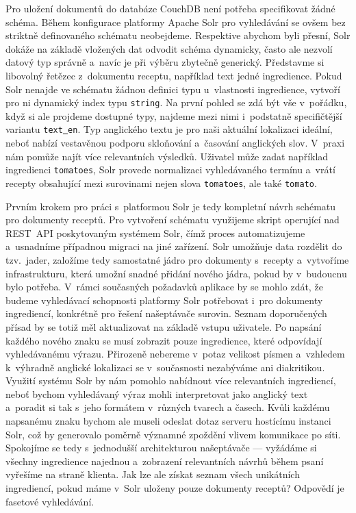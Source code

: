 Pro uložení dokumentů do databáze CouchDB není potřeba specifikovat žádné schéma. Během konfigurace platformy Apache Solr pro vyhledávání se ovšem bez striktně definovaného schématu neobejdeme. Respektive abychom byli přesní, Solr dokáže na základě vložených dat odvodit schéma dynamicky, často ale nezvolí datový typ správně a~navíc je při výběru zbytečně generický. Představme si libovolný řetězec z~dokumentu receptu, například text jedné ingredience. Pokud Solr nenajde ve schématu žádnou definici typu u~vlastnosti ingredience, vytvoří pro ni dynamický index typu \texttt{string}. Na první pohled se zdá být vše v~pořádku, když si ale projdeme dostupné typy, najdeme mezi nimi i~podstatně specifičtější variantu \texttt{text\underline{{ }}en}. Typ anglického textu je pro naši aktuální lokalizaci ideální, neboť nabízí vestavěnou podporu skloňování a~časování anglických slov. V~praxi nám pomůže najít více relevantních výsledků. Uživatel může zadat například ingredienci \texttt{tomatoes}, Solr provede normalizaci vyhledávaného termínu a~vrátí recepty obsahující mezi surovinami nejen slova \texttt{tomatoes}, ale také \texttt{tomato}.

Prvním krokem pro práci s~platformou Solr je tedy kompletní návrh schématu pro dokumenty receptů. Pro vytvoření schématu využijeme skript operující nad REST~API poskytovaným systémem Solr, čímž proces automatizujeme a~usnadníme případnou migraci na jiné zařízení. Solr umožňuje data rozdělit do tzv.~jader, založíme tedy samostatné jádro pro dokumenty s~recepty a~vytvoříme infrastrukturu, která umožní snadné přidání nového jádra, pokud by v~budoucnu bylo potřeba. V~rámci současných požadavků aplikace by se mohlo zdát, že budeme vyhledávací schopnosti platformy Solr potřebovat i~pro dokumenty ingrediencí, konkrétně pro řešení našeptávače surovin. Seznam doporučených přísad by se totiž měl aktualizovat na základě vstupu uživatele. Po napsání každého nového znaku se musí zobrazit pouze ingredience, které odpovídají vyhledávanému výrazu. Přirozeně nebereme v~potaz velikost písmen a~vzhledem k~výhradně anglické lokalizaci se v~současnosti nezabýváme ani diakritikou. Využití systému Solr by nám pomohlo nabídnout více relevantních ingrediencí, neboť bychom vyhledávaný výraz mohli interpretovat jako anglický text a~poradit si tak s~jeho formátem v~různých tvarech a časech. Kvůli každému napsanému znaku bychom ale museli odeslat dotaz serveru hostícímu instanci Solr, což by generovalo poměrně významné zpoždění vlivem komunikace po síti. Spokojíme se tedy s~jednodušší architekturou našeptávače --- vyžádáme si všechny ingredience najednou a~zobrazení relevantních návrhů během psaní vyřešíme na straně klienta. Jak lze ale získat seznam všech unikátních ingrediencí, pokud máme v~Solr uloženy pouze dokumenty receptů? Odpovědí je fasetové vyhledávání.

